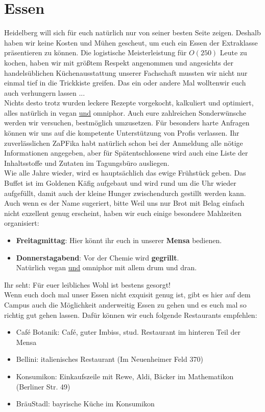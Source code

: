 
\section{Essen}
  Heidelberg will sich für euch natürlich nur von seiner besten Seite zeigen. Deshalb haben wir keine Kosten und Mühen gescheut,
  um euch ein Essen der Extraklasse präsentieren zu können.
  Die logistische Meisterleistung für $O(250)$ Leute zu kochen, haben wir mit größtem Respekt angenommen und
  angesichts der handelsüblichen Küchenausstattung unserer Fachschaft mussten wir nicht nur einmal tief in
  die Trickkiste greifen. Das ein oder andere Mal wolltenwir euch auch verhungern lassen ... \\
  Nichts desto trotz wurden leckere Rezepte vorgekocht, kalkuliert und optimiert, alles natürlich in vegan \underline{und} omniphor.
  Auch eure zahlreichen Sonderwünsche werden wir versuchen, bestmöglich umzusetzen. Für besonders harte Anfragen
  können wir uns auf die kompetente Unterstützung von Profis verlassen.
  Ihr zuverlässlichen ZaPFika habt natürlich schon bei der Anmeldung alle nötige Informationen angegeben,
  aber für Spätentschlossene wird auch eine Liste der Inhaltsstoffe und Zutaten im Tagungsbüro ausliegen. \\

  Wie alle Jahre wieder, wird es hauptsächlich das ewige Frühstück geben. Das Buffet ist im Goldenen
  Käfig aufgebaut und wird rund um die Uhr wieder aufgefüllt, damit auch der kleine
  Hunger zwischendurch gestillt werden kann. Auch wenn es der Name sugeriert, bitte
  Weil uns nur Brot mit Belag einfach nicht exzellent genug erscheint, haben wir euch einige besondere Mahlzeiten organisiert:
  \begin{itemize}
    \item \textbf{Freitagmittag}: Hier könnt ihr euch in unserer \textbf{Mensa} bedienen.
    \item \textbf{Donnerstagabend}: Vor der Chemie wird \textbf{gegrillt}. \\
      Natürlich vegan \underline{und} omniphor mit allem drum und dran.
  \end{itemize}
  Ihr seht: Für euer leibliches Wohl ist bestens gesorgt! \\

  Wenn euch doch mal unser Essen nicht exquisit genug ist, gibt es hier auf dem Campus auch die Möglichkeit
  anderweitig Essen zu gehen und es euch mal so richtig gut gehen lassen. Dafür können wir euch
  folgende Restaurants empfehlen:
  \begin{itemize}
  \item Café Botanik: Café, guter Imbiss, stud. Restaurant im hinteren Teil der Mensa
  \item Bellini: italienisches Restaurant (Im Neuenheimer Feld 370)
  \item Konsumikon: Einkaufszeile mit Rewe, Aldi, Bäcker im Mathematikon (Berliner Str. 49)
  \item BräuStadl: bayrische Küche im Konsumikon
  \end{itemize}
